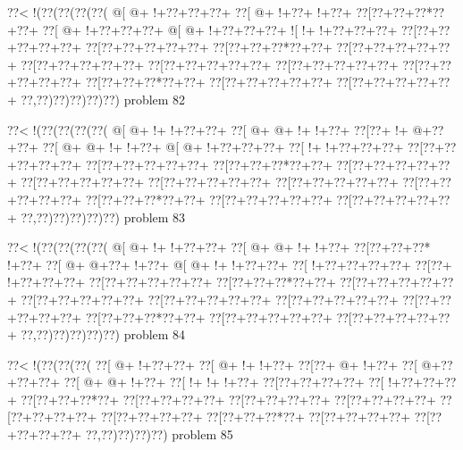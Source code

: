 \vbox{\vbox{\goo
\0??<\- !(\0??(\0??(\0??(\0??(
\- @[\- @+\- !+\0??+\0??+\0??+
\0??[\- @+\- !+\0??+\- !+\0??+
\0??[\0??+\0??+\0??*\0??+\0??+
\0??[\- @+\- !+\0??+\0??+\0??+
\- @[\- @+\- !+\0??+\0??+\0??+
\- ![\- !+\- !+\0??+\0??+\0??+
\0??[\0??+\0??+\0??+\0??+\0??+
\0??[\0??+\0??+\0??+\0??+\0??+
\0??[\0??+\0??+\0??*\0??+\0??+
\0??[\0??+\0??+\0??+\0??+\0??+
\0??[\0??+\0??+\0??+\0??+\0??+
\0??[\0??+\0??+\0??+\0??+\0??+
\0??[\0??+\0??+\0??+\0??+\0??+
\0??[\0??+\0??+\0??+\0??+\0??+
\0??[\0??+\0??+\0??*\0??+\0??+
\0??[\0??+\0??+\0??+\0??+\0??+
\0??[\0??+\0??+\0??+\0??+\0??+
\0??,\0??)\0??)\0??)\0??)\0??)
}
\hfil problem 82\hfil\break
}

\vbox{\vbox{\goo
\0??<\- !(\0??(\0??(\0??(\0??(
\- @[\- @+\- !+\- !+\0??+\0??+
\0??[\- @+\- @+\- !+\- !+\0??+
\0??[\0??+\- !+\- @+\0??+\0??+
\0??[\- @+\- @+\- !+\- !+\0??+
\- @[\- @+\- !+\0??+\0??+\0??+
\0??[\- !+\- !+\0??+\0??+\0??+
\0??[\0??+\0??+\0??+\0??+\0??+
\0??[\0??+\0??+\0??+\0??+\0??+
\0??[\0??+\0??+\0??*\0??+\0??+
\0??[\0??+\0??+\0??+\0??+\0??+
\0??[\0??+\0??+\0??+\0??+\0??+
\0??[\0??+\0??+\0??+\0??+\0??+
\0??[\0??+\0??+\0??+\0??+\0??+
\0??[\0??+\0??+\0??+\0??+\0??+
\0??[\0??+\0??+\0??*\0??+\0??+
\0??[\0??+\0??+\0??+\0??+\0??+
\0??[\0??+\0??+\0??+\0??+\0??+
\0??,\0??)\0??)\0??)\0??)\0??)
}
\hfil problem 83\hfil\break
}

\vbox{\vbox{\goo
\0??<\- !(\0??(\0??(\0??(\0??(
\- @[\- @+\- !+\- !+\0??+\0??+
\0??[\- @+\- @+\- !+\- !+\0??+
\0??[\0??+\0??+\0??*\- !+\0??+
\0??[\- @+\- @+\0??+\- !+\0??+
\- @[\- @+\- !+\- !+\0??+\0??+
\0??[\- !+\0??+\0??+\0??+\0??+
\0??[\0??+\- !+\0??+\0??+\0??+
\0??[\0??+\0??+\0??+\0??+\0??+
\0??[\0??+\0??+\0??*\0??+\0??+
\0??[\0??+\0??+\0??+\0??+\0??+
\0??[\0??+\0??+\0??+\0??+\0??+
\0??[\0??+\0??+\0??+\0??+\0??+
\0??[\0??+\0??+\0??+\0??+\0??+
\0??[\0??+\0??+\0??+\0??+\0??+
\0??[\0??+\0??+\0??*\0??+\0??+
\0??[\0??+\0??+\0??+\0??+\0??+
\0??[\0??+\0??+\0??+\0??+\0??+
\0??,\0??)\0??)\0??)\0??)\0??)
}
\hfil problem 84\hfil\break
}

\vbox{\vbox{\goo
\0??<\- !(\0??(\0??(\0??(
\0??[\- @+\- !+\0??+\0??+
\0??[\- @+\- !+\- !+\0??+
\0??[\0??+\- @+\- !+\0??+
\0??[\- @+\0??+\0??+\0??+
\0??[\- @+\- @+\- !+\0??+
\0??[\- !+\- !+\- !+\0??+
\0??[\0??+\0??+\0??+\0??+
\0??[\- !+\0??+\0??+\0??+
\0??[\0??+\0??+\0??*\0??+
\0??[\0??+\0??+\0??+\0??+
\0??[\0??+\0??+\0??+\0??+
\0??[\0??+\0??+\0??+\0??+
\0??[\0??+\0??+\0??+\0??+
\0??[\0??+\0??+\0??+\0??+
\0??[\0??+\0??+\0??*\0??+
\0??[\0??+\0??+\0??+\0??+
\0??[\0??+\0??+\0??+\0??+
\0??,\0??)\0??)\0??)\0??)
}
\hfil problem 85\hfil\break
}


